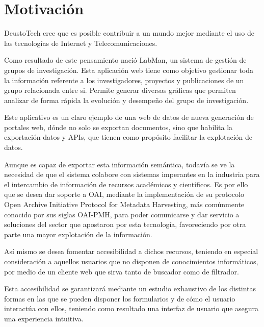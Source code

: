 \section{Motivación}

DeustoTech cree que es posible contribuir a un mundo mejor mediante el uso de las tecnologías de Internet y Telecomunicaciones.

Como resultado de este pensamiento nació LabMan, un sistema de gestión de grupos de investigación. Esta aplicación web tiene como objetivo gestionar toda la información referente a los investigadores, proyectos y publicaciones de un grupo relacionada entre si. Permite generar diversas gráficas que permiten analizar de forma rápida la evolución y desempeño del grupo de investigación.

Este aplicativo es un claro ejemplo de una web de datos de nueva generación de portales web, dónde no solo se exportan documentos, sino que habilita la exportación datos y APIs, que tienen como propósito facilitar la explotación de datos.

Aunque es capaz de exportar esta información semántica, todavía se ve la necesidad de que el sistema colabore con sistemas imperantes en la industria para el intercambio de información de recursos académicos y científicos.
Es por ello que se desea dar soporte a OAI, mediante la implementación de su protocolo Open Archive Initiative Protocol for Metadata Harvesting, más comúnmente conocido por sus siglas OAI-PMH, para poder comunicarse y dar servicio a soluciones del sector que apostaron por esta tecnología, favoreciendo por otra parte una mayor explotación de la información.

Así mismo se desea fomentar accesibilidad a dichos recursos, teniendo en especial consideración a aquellos usuarios que no disponen de conocimientos informáticos, por medio de un cliente web que sirva tanto de buscador como de filtrador.

Esta accesibilidad se garantizará mediante un estudio exhaustivo de los distintas formas en las que se pueden disponer los formularios y de cómo el usuario interactúa con ellos, teniendo como resultado una interfaz de usuario que asegura una experiencia intuitiva.

